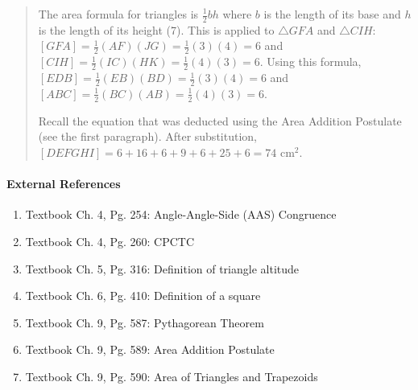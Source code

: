 \documentclass[letterpaper,12pt,twoside]{report}
\begin{document}
\begin{quotation}
	The area formula for triangles is $\frac{1}{2}bh$ where $b$ is the length of its base and $h$ is the length of its height (7). This is applied to $\triangle GFA$ and $\triangle CIH$: $[GFA]=\frac{1}{2}(AF)(JG)=\frac{1}{2}(3)(4)=6$ and $[CIH]=\frac{1}{2}(IC)(HK)=\frac{1}{2}(4)(3)=6$. Using this formula, $[EDB]=\frac{1}{2}(EB)(BD)=\frac{1}{2}(3)(4)=6$ and $[ABC]=\frac{1}{2}(BC)(AB)=\frac{1}{2}(4)(3)=6$.
	
	Recall the equation that was deducted using the Area Addition Postulate (see the first paragraph). After substitution, $[DEFGHI]=6+16+6+9+6+25+6=\boxed{74 \text{ cm}^2}$.
	
\end{quotation}
	
	\paragraph{External References}
	
	\begin{enumerate}
		\item Textbook Ch. 4, Pg. 254: Angle-Angle-Side (AAS) Congruence
		\item Textbook Ch. 4, Pg. 260: CPCTC
		\item Textbook Ch. 5, Pg. 316: Definition of triangle altitude
		\item Textbook Ch. 6, Pg. 410: Definition of a square
		\item Textbook Ch. 9, Pg. 587: Pythagorean Theorem
		\item Textbook Ch. 9, Pg. 589: Area Addition Postulate
		\item Textbook Ch. 9, Pg. 590: Area of Triangles and Trapezoids
		
	\end{enumerate}
	
\end{document}
